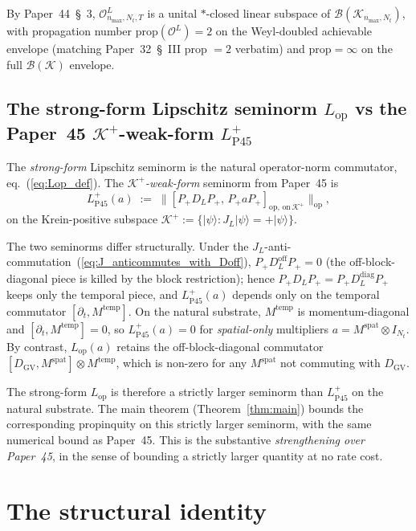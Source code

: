 \documentclass[11pt,a4paper]{article}
\theoremstyle{plain}
\theoremstyle{definition}
\newcommand{\nmax}{n_{\max}}
\newcommand{\Nt}{N_{t}}
\newcommand{\Krein}{\mathcal{K}}
\newcommand{\Op}{\mathcal{O}}
\newcommand{\Bcal}{\mathcal{B}}
\newcommand{\opnorm}[1]{\lVert #1 \rVert_{\mathrm{op}}}
\newcommand{\DGV}{D_{\mathrm{GV}}}
\newcommand{\DL}{D_{L}}
\newcommand{\JL}{J_{L}}
\newcommand{\Lop}{L_{\mathrm{op}}}
\newcommand{\LPwk}{L^{+}_{\mathrm{P45}}}
\newcommand{\Kplus}{\Krein^{+}}
\newcommand{\Pplus}{P_{+}}
\newcommand{\prop}{\mathrm{prop}}
\newcommand{\spat}{\mathrm{spat}}
\newcommand{\temp}{\mathrm{temp}}
\begin{document}
By Paper~44~\S~3, $\Op^{L}_{\nmax,\Nt,T}$ is a unital $\ast$-closed
linear subspace of $\Bcal(\Krein_{\nmax,\Nt})$, with propagation number
$\prop(\Op^{L}) = 2$ on the Weyl-doubled achievable envelope (matching
Paper~32~\S~III prop $= 2$ verbatim) and $\prop = \infty$ on the full
$\Bcal(\Krein)$ envelope.

\subsection{The strong-form Lipschitz seminorm $\Lop$ vs the Paper~45
$\Kplus$-weak-form $\LPwk$}\label{sec:two_seminorms}

The \emph{strong-form} Lipschitz seminorm is the natural operator-norm
commutator, eq.~(\ref{eq:Lop_def}). The \emph{$\Kplus$-weak-form}
seminorm from Paper~45 is
\begin{equation}\label{eq:LPwk_def}
   \LPwk(a) \;:=\; \opnorm{[\Pplus \DL \Pplus,\, \Pplus a \Pplus]_{\mathrm{op,\,on\,}\Kplus}},
\end{equation}
on the Krein-positive subspace $\Kplus := \{|\psi\rangle :
\JL|\psi\rangle = +|\psi\rangle\}$.

The two seminorms differ structurally. Under the
$\JL$-anti-commutation~(\ref{eq:J_anticommutes_with_Doff}),
$\Pplus \DL^{\mathrm{off}} \Pplus = 0$ (the off-block-diagonal piece is
killed by the block restriction); hence $\Pplus \DL \Pplus =
\Pplus \DL^{\mathrm{diag}} \Pplus$ keeps only the temporal piece, and
$\LPwk(a)$ depends only on the temporal commutator $[\partial_{t},
M^{\temp}]$. On the natural substrate, $M^{\temp}$ is momentum-diagonal
and $[\partial_{t}, M^{\temp}] = 0$, so $\LPwk(a) = 0$ for
\emph{spatial-only} multipliers $a = M^{\spat} \otimes I_{\Nt}$. By
contrast, $\Lop(a)$ retains the off-block-diagonal commutator
$[\DGV, M^{\spat}] \otimes M^{\temp}$, which is non-zero for any
$M^{\spat}$ not commuting with $\DGV$.

The strong-form $\Lop$ is therefore a strictly larger seminorm than
$\LPwk$ on the natural substrate. The main theorem
(Theorem~\ref{thm:main}) bounds the corresponding propinquity on this
strictly larger seminorm, with the same numerical bound as Paper~45.
This is the substantive \emph{strengthening over Paper~45}, in the
sense of bounding a strictly larger quantity at no rate cost.

\section{The structural identity}\label{sec:structural_identity}
\end{document}
